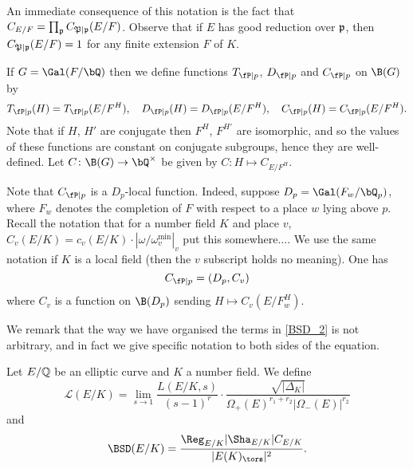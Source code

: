 An immediate consequence of this notation is the fact that $C_{E/F}=\prod_{\mathfrak{p}}C_{\mathfrak{P}\mid \mathfrak{p}}(E / F)$.
Observe that if $E$ has good reduction over $\mathfrak{p}$, then $C_{\mathfrak{P}\mid\mathfrak{p}}(E/F)=1$ for any finite extension $F$ of $K$. 

\begin{notation}\label{not_contr_fns}
    If $G = \Gal(F / \bQ)$ then we define functions $T_{\fP \mid p}$, $D_{\fP \mid p}$ and $C_{\fP \mid p}$ on $\B(G)$ by 
    \[ T_{\fP \mid p}(H) = T_{\fP \mid p}(E / F^H), \quad D_{\fP \mid p}(H) = D_{\fP \mid p}(E / F^H), \quad C_{\fP \mid p}(H) = C_{\fP \mid p}(E / F^H). \]
    Note that if $H$, $H'$ are conjugate then $F^H$, $F^{H'}$ are isomorphic, and so the values of these functions are constant on conjugate subgroups, hence they are well-defined. Let $C \colon \B(G) \to \bQ^{\times}$ be given by $C \colon H \mapsto C_{E / F^H}$.  
    
    Note that $C_{\fP \mid p}$ is a $D_p$-local function. Indeed, suppose $D_p = \Gal(F_w / \bQ_p)$, where $F_w$ denotes the completion of $F$ with respect to a place $w$ lying above $p$. Recall the notation that for a number field $K$ and place $v$, $C_v(E / K) = c_v(E / K) \cdot \left| \omega / \omega_v^{\min} \right|_v$ {\color{red} put this somewhere...}. We use the same notation if $K$ is a local field (then the $v$ subscript holds no meaning).
    One has
    \begin{equation*}
    C_{\fP \mid p} = (D_p, C_v)
    \end{equation*}
    where $C_v$ is a function on $\B(D_p)$ sending $H \mapsto C_v(E / F_w^H)$.

\end{notation}


We remark that the way we have organised the terms in \eqref{BSD_2} is not arbitrary, and in fact we give specific notation to both sides of the equation. 

\begin{notation}
    Let $E/\mathbb{Q}$ be an elliptic curve and $K$ a number field. We define 
    $$\mathcal{L}(E/K)=\lim_{s\to1}\frac{L(E/K,s)}{(s-1)^r}\cdot\frac{\sqrt{|\Delta_K|}}{\Omega_+(E)^{r_1+r_2}|\Omega_-(E)|^{r_2}}$$
    and
    $$\BSD(E/K)=\frac{\Reg_{E/K}|\Sha_{E/K}|C_{E/K}}{|E(K)_{\tors}|^2}.$$
\end{notation}


